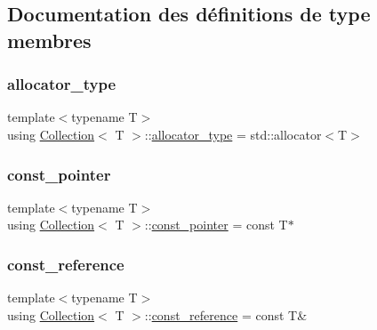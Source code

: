 \subsection{Documentation des définitions de type membres}
\mbox{\label{class_collection_ac7974b0b552f0a94065aadc48ae53397}} 
\subsubsection{\texorpdfstring{allocator\+\_\+type}{allocator\_type}}
{\footnotesize\ttfamily template$<$typename T$>$ \\
using \hyperlink{class_collection}{Collection}$<$ T $>$\+::\hyperlink{class_collection_ac7974b0b552f0a94065aadc48ae53397}{allocator\+\_\+type} =  std\+::allocator$<$T$>$}

\mbox{\label{class_collection_a79ea96d1fa145e340e907547d0053b81}} 
\subsubsection{\texorpdfstring{const\+\_\+pointer}{const\_pointer}}
{\footnotesize\ttfamily template$<$typename T$>$ \\
using \hyperlink{class_collection}{Collection}$<$ T $>$\+::\hyperlink{class_collection_a79ea96d1fa145e340e907547d0053b81}{const\+\_\+pointer} =  const T$\ast$}

\mbox{\label{class_collection_abb8c0f6de5e322aa531837aab7358b89}} 
\subsubsection{\texorpdfstring{const\+\_\+reference}{const\_reference}}
{\footnotesize\ttfamily template$<$typename T$>$ \\
using \hyperlink{class_collection}{Collection}$<$ T $>$\+::\hyperlink{class_collection_abb8c0f6de5e322aa531837aab7358b89}{const\+\_\+reference} =  const T\&}

